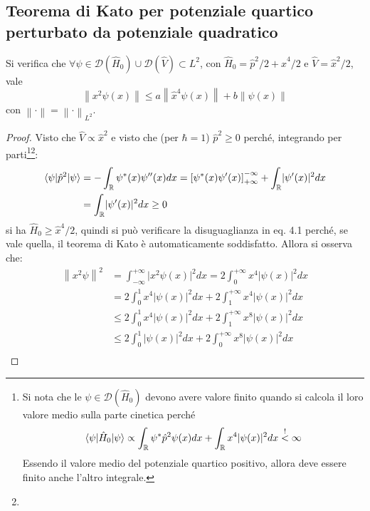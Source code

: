\documentclass[10pt, a4paper]{scrartcl} %
\numberwithin{equation}{section}
\theoremstyle{style2}
\theoremstyle{style1}
\begin{document}
\subsection{Teorema di Kato per potenziale quartico perturbato da potenziale quadratico}
Si verifica che $\forall \psi \in \mathcal{D} (\hat{H}_0)\cup \mathcal{D} (\hat{V}) \subset L^2$, con $\hat{H}_0 = \hat{p}^2 / 2 + \hat{x}^4 / 2$ e $\hat{V} = \hat{x}^2 / 2$, vale
\begin{equation}
\left\lVert x^2 \psi (x)\right\rVert \le a \left\lVert \hat{x}^4 \psi (x) \right\rVert  + b \left\lVert \psi (x) \right\rVert 
\end{equation}
con $\left\lVert \cdot  \right\rVert = \left\lVert \cdot  \right\rVert _{L^2} $.
\begin{proof}
	Visto che $\hat{V}\propto \hat{x}^2$ e visto che (per $\hbar =1$) $\hat{p}^2\ge 0$ perch\'e, integrando per parti\footnote{Si nota che le $\psi \in \mathcal{D} (\hat{H}_0)$ devono avere valore finito quando si calcola il loro valore medio sulla parte cinetica perch\'e
	\[
	\braket{\psi |\hat{H}_0|\psi } \propto\int_{\mathbb{R}} \psi ^* \hat{p}^2 \psi (x) dx + \int_{\mathbb{R}} x^4\lvert \psi (x) \rvert ^2 dx \stackrel{!}{<} \infty
	\] 
Essendo il valore medio del potenziale quartico positivo, allora deve essere finito anche l'altro integrale.}\footnote{}:
	\[
		\begin{split}
			\braket{\psi |\hat{p}^2|\psi }  &= -\int_{\mathbb{R}} \psi ^*(x) \psi ''(x)  dx = \left[ \psi ^*(x)\psi '(x) \right] _{+\infty} ^{-\infty} + \int_{\mathbb{R}} \lvert \psi '(x) \rvert ^2 dx\\
							      &=\int_{\mathbb{R}} \lvert \psi '(x) \rvert ^2 dx \ge 0
		\end{split}
	\] 
	si ha $\hat{H}_0 \ge \hat{x}^4 / 2$, quindi si pu\`o verificare la disuguaglianza in eq. 4.1 perch\'e, se vale quella, il teorema di Kato \`e automaticamente soddisfatto.
	Allora si osserva che:
	\[
	\begin{split}
		\left\lVert x^2 \psi \right\rVert ^2 &= \int_{-\infty} ^{+\infty} \lvert x^2 \psi (x) \rvert ^2dx = 2 \int_{0} ^{+\infty} x^4 \lvert \psi (x) \rvert ^2 dx\\
						     &= 2 \int_{0} ^1 x^4 \lvert \psi (x) \rvert ^2 dx + 2 \int_{1} ^{+\infty} x^4 \lvert \psi (x) \rvert ^2 dx \\
						     &\le 2 \int_{0} ^1 x^4 \lvert \psi (x) \rvert ^2 dx + 2 \int_{1} ^{+\infty} x^8 \lvert \psi (x) \rvert ^2 dx\\
						     &\le 2 \int_{0} ^1 \lvert \psi (x) \rvert ^2 dx + 2 \int_{0} ^{+\infty} x^8 \lvert \psi (x) \rvert ^2 dx \\

\end{split}\]
\end{proof}
\end{document}
